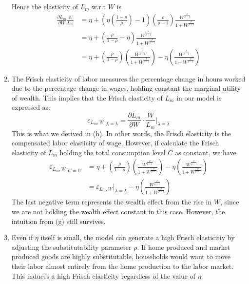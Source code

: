 \documentclass[11pt]{amsart}
\begin{document}
\begin{enumerate}[label = (\alph*)]
\begin{equation*}
	\end{equation*}
	Hence the elasticity of $L_m$ w.r.t $W$ is
	\begin{align*}
	\frac{\partial L_m}{\partial W} \frac{W}{L_m} &= \eta + \left( \eta \left( \frac{1-\rho}{\rho} \right) -1  \right) \left( \frac{\rho}{\rho-1} \right) \frac{W^{\frac{\rho}{\rho-1}}}{1 + W^{\frac{\rho}{\rho-1}}} \\
	& = \eta + \left(  \frac{\rho}{1-\rho} - \eta \right) \frac{W^{\frac{\rho}{\rho-1}}}{1 + W^{\frac{\rho}{\rho-1}}} \\
	& =  \eta + \left( \frac{\rho}{1-\rho} \right) \left( \frac{W^{\frac{\rho}{\rho-1}}}{1 + W^{\frac{\rho}{\rho-1}}} \right) - \eta \left(  \frac{W^{\frac{\rho}{\rho-1}}}{1 + W^{\frac{\rho}{\rho-1}}}  \right)
	\end{align*}
	\item The Frisch elasticity of labor measures the percentage change in hours worked due to the percentage change in wages, holding constant the marginal utility of wealth. This implies that the Frisch elasticity of $L_m$ in our model is expressed as:
    \begin{equation*}
    \varepsilon_{L_m, W} \big|_{\lambda = \bar{\lambda}} = \frac{\partial L_m}{\partial W} \cdot \frac{W}{L_m} \big|_{\lambda = \bar{\lambda}}
    \end{equation*}
    This is what we derived in (h). In other words, the Frisch elasticity is the compensated labor elasticity of wage. However, if calculate the Frisch elasticity of $L_m$ holding the total consumption level $C$ as constant, we have 
    \begin{align*}
    \varepsilon_{L_m, W}\big|_{C = \bar{C}} &= \eta + \left( \frac{\rho}{1-\rho} \right) \left( \frac{W^{\frac{\rho}{\rho-1}}}{1 + W^{\frac{\rho}{\rho-1}}} \right) - \eta \left(  \frac{W^{\frac{\rho}{\rho-1}}}{1 + W^{\frac{\rho}{\rho-1}}}  \right) \\
    & = \varepsilon_{L_m, W} \big|_{\lambda = \bar{\lambda}} - \eta \left(  \frac{W^{\frac{\rho}{\rho-1}}}{1 + W^{\frac{\rho}{\rho-1}}}  \right)
    \end{align*}
    The last negative term represents the wealth effect from the rise in $W$, since we are not holding the wealth effect constant in this case. However, the intuition from (g) still survives. 
    
	\item Even if $\eta$ itself is small, the model can generate a high Frisch elasticitiy by adjusting the substitutability parameter $\rho$. If home produced and market produced goods are highly substitutable, households would want to move their labor almost entirely from the home production to the labor market. This induces a high Frisch elasticity regardless of the value of $\eta$. 

\end{enumerate}
\end{document}

